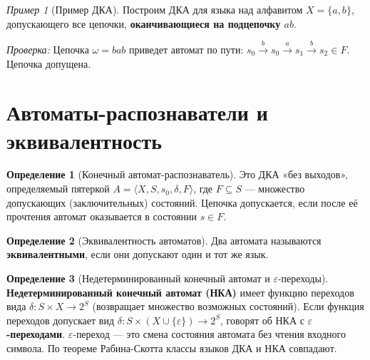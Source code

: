 \documentclass[12pt,a4paper]{article}
\theoremstyle{definition}
\newtheorem{definition}{Определение}
\theoremstyle{plain}
\theoremstyle{remark}
\newtheorem{example}{Пример}
\begin{document}
\begin{example}[Пример ДКА]
Построим ДКА для языка над алфавитом $X = \{a, b\}$, допускающего все цепочки, \textbf{оканчивающиеся на подцепочку $ab$}.
\begin{center}
\end{center}
\textit{Проверка:} Цепочка $\omega = bab$ приведет автомат по пути: $s_0 \xrightarrow{b} s_0 \xrightarrow{a} s_1 \xrightarrow{b} s_2 \in F$. Цепочка допущена.
\end{example}

\section{Автоматы-распознаватели и эквивалентность}

\begin{definition}[Конечный автомат-распознаватель]
Это ДКА «без выходов», определяемый пятеркой $A = \langle X, S, s_0, \delta, F \rangle$, где $F \subseteq S$ — множество допускающих (заключительных) состояний. Цепочка допускается, если после её прочтения автомат оказывается в состоянии $s \in F$.
\end{definition}

\begin{definition}[Эквивалентность автоматов]
Два автомата называются \textbf{эквивалентными}, если они допускают один и тот же язык.
\end{definition}

\begin{definition}[Недетерминированный конечный автомат и $\varepsilon$-переходы]
\textbf{Недетерминированный конечный автомат (НКА)} имеет функцию переходов вида $\delta: S \times X \to 2^S$ (возвращает множество возможных состояний).
Если функция переходов допускает вид $\delta: S \times (X \cup \{\varepsilon\}) \to 2^S$, говорят об НКА с \textbf{$\varepsilon$-переходами}. $\varepsilon$-переход — это смена состояния автомата без чтения входного символа. По теореме Рабина-Скотта классы языков ДКА и НКА совпадают.
\end{definition}
\end{document}

